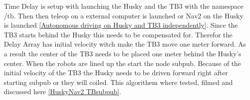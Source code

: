 Time Delay is setup with launching the Husky and the TB3 with the namespace /tb. Then then teleop on a external computer is launched or Nav2 on the Husky is launched \ref{Autonomous driving on Husky and TB3 independently}. Since the TB3 starts behind the Husky this needs to be compensated for. Therefor the Delay Array has initial velocity witch make the TB3 move one meter forward. As a result the center of the TB3 needs to be placed one meter behind the Husky's center. When the robots are lined up the start the node subpub. Because of the initial velocity of the TB3 the Husky needs to be driven forward right after starting subpub or they will coiled. This algorithem where tested, filmed and discussed here \ref{HuskyNav2 TBsubpub}. 